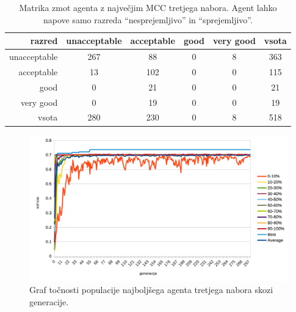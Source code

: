 \begin{table}[H]
    \centering
    \caption{Matrika zmot agenta z največjim MCC tretjega nabora. Agent lahko napove samo razreda \enquote{nesprejemljivo} in \enquote{sprejemljivo}.}
    \begin{tabular}{||rccccc||}
        \hline
        razred       & unacceptable & acceptable & good & very good & vsota \\ \hline
        unacceptable & 267          & 88         & 0    & 8         & 363   \\ \hline
        acceptable   & 13            & 102        & 0    & 0         & 115   \\ \hline
        good         & 0            & 21         & 0    & 0         & 21    \\ \hline
        very good    & 0            & 19         & 0    & 0         & 19    \\ \hline
        vsota        & 280          & 230        & 0    & 8         & 518   \\ \hline
    \end{tabular}
    \label{tab:car_mcc_3}
\end{table}

\begin{figure}[H]
    \begin{center}
        \includegraphics[width=13cm]{car/3/acc}
    \end{center}
    \caption{Graf točnosti populacije najboljšega agenta tretjega nabora skozi generacije.}
    \label{fig:car_acc_3}
\end{figure}


